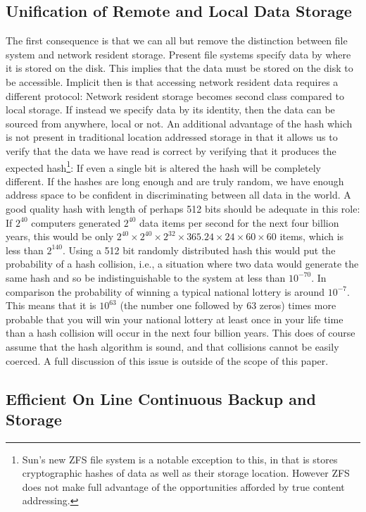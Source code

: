 \documentclass[british,english]{article}
\begin{document}
\subsection{Unification of Remote and Local Data Storage}

The first consequence is that we can all but remove the distinction
between file system and network resident storage. Present file systems
specify data by where it is stored on the disk. This implies that
the data must be stored on the disk to be accessible. Implicit then
is that accessing network resident data requires a different protocol:
Network resident storage becomes second class compared to local storage.
If instead we specify data by its identity, then the data can be sourced
from anywhere, local or not. An additional advantage of the hash which
is not present in traditional location addressed storage in that it
allows us to verify that the data we have read is correct by verifying
that it produces the expected hash\footnote{Sun's new ZFS file system is a notable exception to this, in that
is stores cryptographic hashes of data as well as their storage location.
However ZFS does not make full advantage of the opportunities afforded
by true content addressing.}: If even a single bit is altered the hash will be completely different.
If the hashes are long enough and are truly random, we have enough
address space to be confident in discriminating between all data in
the world. A good quality hash with length of perhaps 512 bits should
be adequate in this role: If $2^{40}$ computers generated $2^{40}$
data items per second for the next four billion years, this would
be only $2^{40}\times2^{40}\times2^{32}\times365.24\times24\times60\times60$
items, which is less than $2^{140}$. Using a 512 bit randomly distributed
hash this would put the probability of a hash collision, i.e., a situation
where two data would generate the same hash and so be indistinguishable
to the system at less than $10^{-70}$. In comparison the probability
of winning a typical national lottery is around $10^{-7}$. This means
that it is $10^{63}$ (the number one followed by 63 zeros) times
more probable that you will win your national lottery at least once
in your life time than a hash collision will occur in the next four
billion years. This does of course assume that the hash algorithm
is sound, and that collisions cannot be easily coerced. A full discussion
of this issue is outside of the scope of this paper.


\subsection{Efficient On Line Continuous Backup and Storage}
\end{document}
